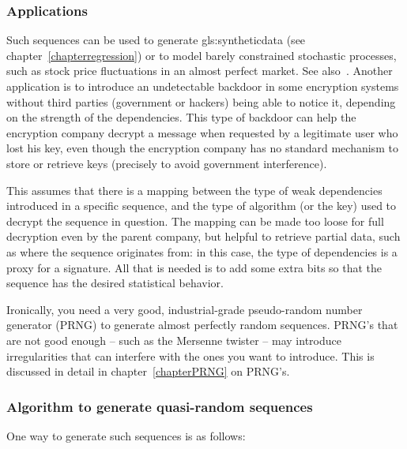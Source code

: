\documentclass[oneside,10pt]{book}
\begin{document}
\subsubsection{Applications}

Such sequences can be used to generate \gls{gls:syntheticdata} (see chapter~\ref{chapterregression}) or to model barely constrained stochastic processes, such as stock price fluctuations in an almost perfect market. See also~\cite{pac203}. Another application is  
 to introduce an undetectable backdoor in some encryption systems without third parties (government or hackers) being able to notice it, depending on the strength of the dependencies. This type of backdoor can help the encryption company decrypt a message when requested by a 
 legitimate user who lost his key, even though the encryption company has no standard mechanism to store or retrieve keys (precisely to avoid government interference). 

This assumes that there is a mapping between the  type of weak dependencies introduced in a specific sequence, and the 
 type of algorithm (or the key) used to decrypt the sequence in question. The mapping can be made too loose for full decryption even by the parent company, but helpful to retrieve partial data, such as where the sequence originates from: in this case, the type of dependencies is a proxy for a signature. All that is needed is to add some extra bits so that the sequence has the desired statistical behavior.

Ironically, you need a very good, industrial-grade \textcolor{index}{pseudo-random number generator} (PRNG) to generate almost perfectly random sequences. PRNG's that are not good enough -- such as the \textcolor{index}{Mersenne twister} -- may introduce irregularities that can interfere with the ones you want to introduce. This is discussed 
 in detail in chapter~\ref{chapterPRNG} on PRNG's.

\subsubsection{Algorithm to generate quasi-random sequences}\label{qrrnd}

One way to generate such sequences is as follows: \vspace{1ex}
\end{document}
